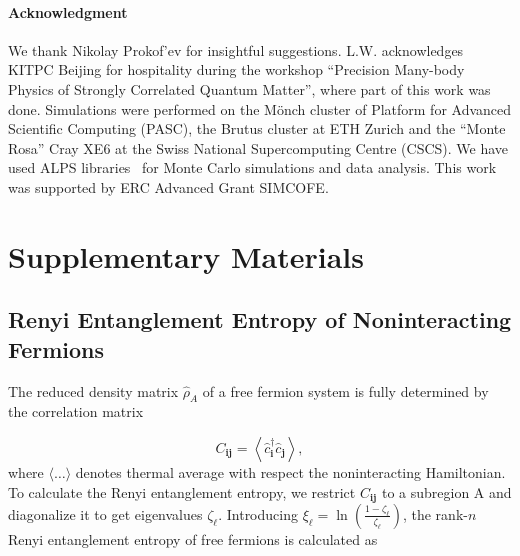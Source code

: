 \documentclass[12pt,onecolumn,english,prl,showpacs,nofootinbib]{revtex4-1}
\begin{document}
\paragraph{Acknowledgment}
We thank Nikolay Prokof'ev for insightful suggestions. L.W. acknowledges KITPC Beijing for hospitality during the workshop ``Precision Many-body Physics of Strongly Correlated Quantum Matter'', where part of this work was done. Simulations were performed on the M\"{o}nch cluster of Platform for Advanced Scientific Computing (PASC), the Brutus cluster at ETH Zurich and the ``Monte Rosa'' Cray XE6 at the Swiss National Supercomputing Centre (CSCS). We have used ALPS libraries~\cite{BBauer:2011tz} for Monte Carlo simulations and data analysis. This work was supported by ERC Advanced Grant SIMCOFE.




%



\clearpage 

\appendix
\section{Supplementary Materials}

\subsection{Renyi Entanglement Entropy of Noninteracting Fermions}

The reduced density matrix $\hat{\rho}_{A}$ of a free fermion system is fully determined by the correlation matrix~\cite{Peschel:2002gz}

\begin{equation*}
C_{\mathbf{ij}} = \left\langle  \hat{c}^{\dagger}_\mathbf{i} \hat{c}_\mathbf{j} \right\rangle,
\end{equation*}
where $\langle \ldots \rangle $ denotes thermal average with respect the noninteracting Hamiltonian. To calculate the Renyi entanglement entropy, we restrict $C_{\mathbf{ij}}$ to a subregion A and diagonalize it to get eigenvalues $\zeta_{\ell}$. Introducing $\xi_{\ell} = \ln(\frac{1-\zeta_{\ell}}{\zeta_{\ell}})$, the rank-$n$ Renyi entanglement entropy of free fermions is calculated as 
\end{document}
